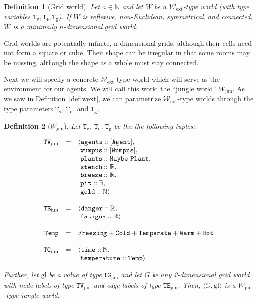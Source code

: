 \documentclass[]{scrartcl}
\theoremstyle{break}
\newtheorem{definition}{Definition}
\renewcommand{\tt}[1]{\texttt{#1}}
\newcommand{\N}{\mathbb{N}}
\newcommand{\R}{\mathbb{R}}
\newcommand{\B}{\mathbb{B}}
\newcommand{\type}[1]{\mathtt{#1}}
\newcommand{\wext}{\ensuremath{\mathcal{W}_{\mathrm{ext}}}}
\newcommand{\wjun}{\ensuremath{W_{\mathrm{jun}}}}
\newcommand{\tuple}[1]{\ensuremath{\langle #1 \rangle}}
\newcommand{\lp}{{\rm (}}
\newcommand{\rp}{{\rm )}}
\newcommand{\paren}[1]{\lp{#1}\rp}
\begin{document}
\begin{definition}[Grid world]
	Let $n \in \N$ and let $W$ be a \wext-type world \paren{with type variables $\type{T_v}, \type{T_e}, \type{T_g}$}. If $W$ is reflexive, non-Euclidean, symmetrical, and connected, $W$ is a {\em minimally $n$-dimensional grid world}.
\end{definition}

Grid worlds are potentially infinite, n-dimensional grids, although their cells need not form a square or cube. Their shape can be irregular in that some rooms may be missing, although the shape as a whole must stay connected.

Next we will specify a concrete \wext-type world which will serve as the environment for our agents. We will call this world the ``jungle world'' \wjun. As we saw in Definition~\ref{def:wext}, we can parametrize \wext-type worlds through the type parameters $\type{T_v}$, $\type{T_e}$, and $\type{T_g}$. 

\begin{definition}[\wjun] Let $\type{T_v}$, $\type{T_e}$, $\type{T_g}$ be the the following tuples:

$$
	\begin{array}{r c l}
		\type{TV_{\mathrm{jun}}} & = & \langle \tt{agents} :: [\type{Agent}],\\
		           &   &       \ \tt{wumpus} :: [\type{Wumpus}],\\
		           &   & 	   \ \tt{plants} :: \type{Maybe\ Plant},\\
		           &   &       \ \tt{stench} :: \R,\\
		           &   &       \ \tt{breeze} :: \R,\\
		           &   &	   \ \tt{pit}    :: \B,\\
		           &   &	   \ \tt{gold}   :: \N \rangle 
		\\
		\\
		\type{TE_{\mathrm{jun}}} & = & \langle \tt{danger} :: \R,\\
				   &   &       \ \tt{fatigue} :: \R \rangle
		\\
		\\
		\type{Temp} & = & \type{Freezing} + \type{Cold} + \type{Temperate} + \type{Warm} + \type{Hot}\\
		\\
		\type{TG_{\mathrm{jun}}} & = & \langle \tt{time} :: \N,\\
				   &   &       \ \tt{temperature} :: \type{Temp} \rangle
	\end{array}
$$

Further, let $\mathrm{gl}$ be a value of type $\type{TG}_{\mathrm{jun}}$ and let $G$ be any 2-dimensional grid world with node labels of type $\type{TV}_{\mathrm{jun}}$ and edge labels of type $\type{TE}_{\mathrm{jun}}$. Then, $\tuple{G, \mathrm{gl}}$ is a \wjun-type jungle world.
\end{definition}

\pagebreak

\nocite{*}




\end{document}
